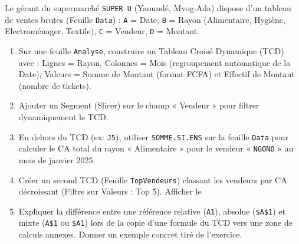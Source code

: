 \documentclass[11pt]{article}
\begin{document}
\begin{exercice}
Le gérant du supermarché \texttt{SUPER U} (Yaoundé, Mvog-Ada) dispose d'un tableau de ventes brutes (Feuille \texttt{Data}) : \texttt{A} = Date, \texttt{B} = Rayon (Alimentaire, Hygiène, Electroménager, Textile), \texttt{C} = Vendeur, \texttt{D} = Montant.
\begin{enumerate}
    \item Sur une feuille \texttt{Analyse}, construire un Tableau Croisé Dynamique (TCD) avec : Lignes = Rayon, Colonnes = Mois (regroupement automatique de la Date), Valeurs = Somme de Montant (format FCFA) et Effectif de Montant (nombre de tickets).
    \item Ajouter un Segment (Slicer) sur le champ « Vendeur » pour filtrer dynamiquement le TCD.
    \item En dehors du TCD (ex: \texttt{J5}), utiliser \texttt{SOMME.SI.ENS} sur la feuille \texttt{Data} pour calculer le CA total du rayon « Alimentaire » pour le vendeur « \texttt{NGONO} » au mois de janvier 2025.
    \item Créer un second TCD (Feuille \texttt{TopVendeurs}) classant les vendeurs par CA décroissant (Filtre sur Valeurs : Top 5). Afficher le %
    \item Expliquer la différence entre une référence relative (\texttt{A1}), absolue (\texttt{\$A\$1}) et mixte (\texttt{A\$1} ou \texttt{\$A1}) lors de la copie d'une formule du TCD vers une zone de calculs annexes. Donner un exemple concret tiré de l'exercice.
\end{enumerate}
\end{exercice}
\end{document}
